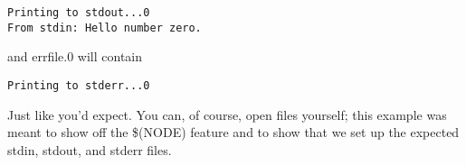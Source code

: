 \begin{verbatim}
Printing to stdout...0
From stdin: Hello number zero.
\end{verbatim}

and errfile.0 will contain

\begin{verbatim}
Printing to stderr...0
\end{verbatim}

Just like you'd expect.  You can, of course, open files yourself; this
example was meant to show off the \$(NODE) feature and to show that 
we set up the expected stdin, stdout, and stderr files.  







